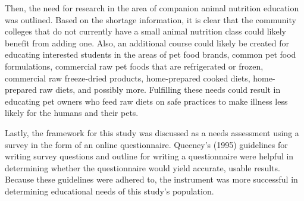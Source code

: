 \par Then, the need for research in the area of companion animal nutrition education was outlined. Based on the shortage information, it is clear that the community colleges that do not currently have a small animal nutrition class could likely benefit from adding one. Also, an additional course could likely be created for educating interested students in the areas of pet food brands, common pet food formulations, commercial raw pet foods that are refrigerated or frozen, commercial raw freeze-dried products, home-prepared cooked diets, home-prepared raw diets, and possibly more. Fulfilling these needs could result in educating pet owners who feed raw diets on safe practices to make illness less likely for the humans and their pets.
\par Lastly, the framework for this study was discussed as a needs assessment using a survey in the form of an online questionnaire. Queeney's (1995) guidelines for writing survey questions and outline for writing a questionnaire were helpful in determining whether the questionnaire would yield accurate, usable results. Because these guidelines were adhered to, the instrument was more successful in determining educational needs of this study's population.